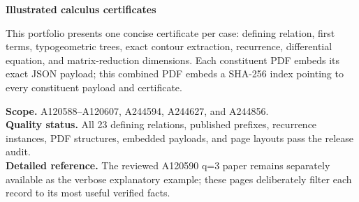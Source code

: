 \documentclass[11pt]{article}
\begin{document}
{\color{navy}\Huge\bfseries Illustrated calculus certificates}\par
\vspace{4mm}{\Large 23 typogeometric OEIS cases}\par
\vspace{8mm}
This portfolio presents one concise certificate per case: defining relation, first terms,
typogeometric trees, exact contour extraction, recurrence, differential equation, and
matrix-reduction dimensions. Each constituent PDF embeds its exact JSON payload; this
combined PDF embeds a SHA-256 index pointing to every constituent payload and certificate.

\vspace{6mm}
\textbf{Scope.} A120588--A120607, A244594, A244627, and A244856.\\
\textbf{Quality status.} All 23 defining relations, published prefixes, recurrence
instances, PDF structures, embedded payloads, and page layouts pass the release audit.\\
\textbf{Detailed reference.} The reviewed A120590 q=3 paper remains separately available
as the verbose explanatory example; these pages deliberately filter each record to its
most useful verified facts.
\end{document}
